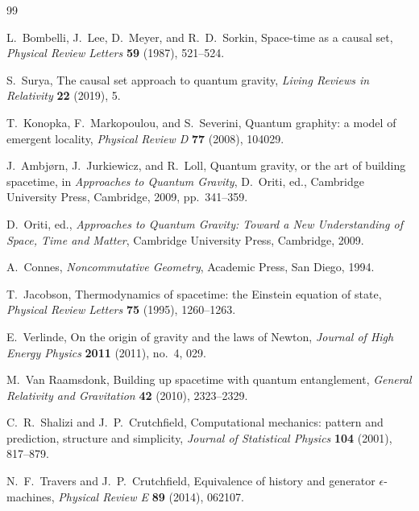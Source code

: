 \documentclass[11pt]{article}
\theoremstyle{definition}
\theoremstyle{remark}
\begin{document}
\begin{thebibliography}{99}

L.~Bombelli, J.~Lee, D.~Meyer, and R.~D.~Sorkin,
\newblock Space-time as a causal set,
\newblock \emph{Physical Review Letters} \textbf{59} (1987), 521--524.

S.~Surya,
\newblock The causal set approach to quantum gravity,
\newblock \emph{Living Reviews in Relativity} \textbf{22} (2019), 5.

T.~Konopka, F.~Markopoulou, and S.~Severini,
\newblock Quantum graphity: a model of emergent locality,
\newblock \emph{Physical Review D} \textbf{77} (2008), 104029.

J.~Ambj{\o}rn, J.~Jurkiewicz, and R.~Loll,
\newblock Quantum gravity, or the art of building spacetime,
\newblock in \emph{Approaches to Quantum Gravity},
D.~Oriti, ed.,
Cambridge University Press, Cambridge, 2009, pp.~341--359.

D.~Oriti, ed.,
\newblock \emph{Approaches to Quantum Gravity: Toward a New Understanding of
Space, Time and Matter},
\newblock Cambridge University Press, Cambridge, 2009.

A.~Connes,
\newblock \emph{Noncommutative Geometry},
\newblock Academic Press, San Diego, 1994.

T.~Jacobson,
\newblock Thermodynamics of spacetime: the Einstein equation of state,
\newblock \emph{Physical Review Letters} \textbf{75} (1995), 1260--1263.

E.~Verlinde,
\newblock On the origin of gravity and the laws of Newton,
\newblock \emph{Journal of High Energy Physics} \textbf{2011} (2011), no.~4,
029.

M.~Van Raamsdonk,
\newblock Building up spacetime with quantum entanglement,
\newblock \emph{General Relativity and Gravitation} \textbf{42} (2010),
2323--2329.

C.~R.~Shalizi and J.~P.~Crutchfield,
\newblock Computational mechanics: pattern and prediction, structure and
simplicity,
\newblock \emph{Journal of Statistical Physics} \textbf{104} (2001),
817--879.

N.~F.~Travers and J.~P.~Crutchfield,
\newblock Equivalence of history and generator $\epsilon$-machines,
\newblock \emph{Physical Review E} \textbf{89} (2014), 062107.


\end{thebibliography}
\end{document}
